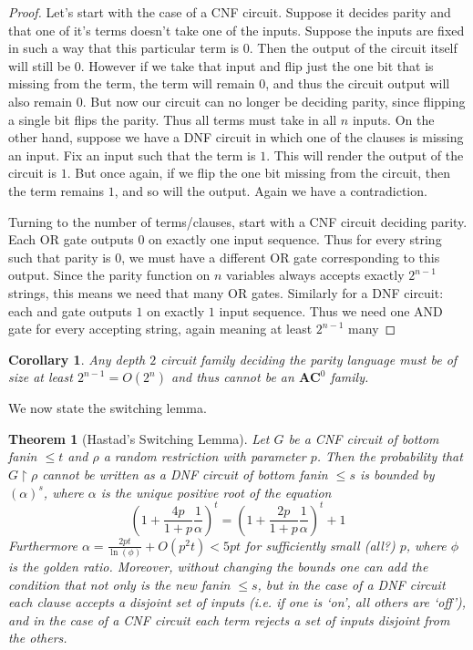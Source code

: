 \documentclass{article}
\theoremstyle{definition}
\theoremstyle{plain}
\theoremstyle{theorem}
\newtheorem{theorem}{Theorem}[section]
\newtheorem{corollary}{Corollary}[section]
\begin{document}
\begin{proof}
	Let's start with the case of a CNF circuit. Suppose it decides parity and that one of it's terms doesn't take one of the inputs. Suppose the inputs are fixed in such a way that this particular term is $0$. Then the output of the circuit itself will still be $0$. However if we take that input and flip just the one bit that is missing from the term, the term will remain $0$, and thus the circuit output will also remain $0$. But now our circuit can no longer be deciding parity, since flipping a single bit flips the parity. Thus all terms must take in all $n$ inputs. On the other hand, suppose we have a DNF circuit in which one of the clauses is missing an input. Fix an input such that the term is $1$. This will render the output of the circuit is $1$. But once again, if we flip the one bit missing from the circuit, then the term remains $1$, and so will the output. Again we have a contradiction. \par 
	Turning to the number of terms/clauses, start with a CNF circuit deciding parity. Each OR gate outputs $0$ on exactly one input sequence. Thus for every string such that parity is $0$, we must have a different OR gate corresponding to this output. Since the parity function on $n$ variables always accepts exactly $2^{n-1}$ strings, this means we need that many OR gates. Similarly for a DNF circuit: each and gate outputs $1$ on exactly $1$ input sequence. Thus we need one AND gate for every accepting string, again meaning at least $2^{n-1}$ many
\end{proof}
\begin{corollary}
	Any depth $2$ circuit family deciding the parity language must be of size at least $2^{n-1} = O(2^n)$ and thus cannot be an $\bm{AC}^0$ family. 
\end{corollary}
We now state the switching lemma. 
\begin{theorem}[Hastad's Switching Lemma]
	Let $G$ be a CNF circuit of bottom fanin $\leq t$ and $\rho$ a random restriction with parameter $p$. Then the probability that $G \restriction \rho$ cannot be written as a DNF circuit of bottom fanin $\leq s$ is bounded by $(\alpha)^s$, where $\alpha$ is the unique positive root of the equation
	\[ (1+\frac{4p}{1+p}\frac{1}{\alpha})^t = (1+\frac{2p}{1+p}\frac{1}{\alpha})^t+1 \]
Furthermore $\alpha = \frac{2pt}{\ln(\phi)} + O(p^2t) < 5pt$ for sufficiently small (all?) $p$, where $\phi$ is the golden ratio. Moreover, without changing the bounds one can add the condition that not only is the new fanin $\leq s$, but in the case of a DNF circuit each clause accepts a disjoint set of inputs (i.e. if one is `on', all others are `off'), and in the case of a CNF circuit each term rejects a set of inputs disjoint from the others.  
\end{theorem}
\end{document}
